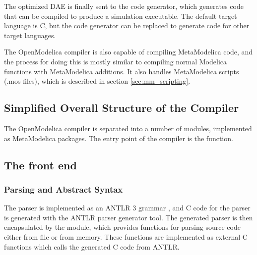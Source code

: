The optimized DAE is finally sent to the code generator, which generates code
that can be compiled to produce a simulation executable. The default target
language is C, but the code generator can be replaced to generate code for other
target languages.

The OpenModelica compiler is also capable of compiling MetaModelica code, and
the process for doing this is mostly similar to compiling normal Modelica
functions with MetaModelica additions. It also handles MetaModelica scripts
(.mos files), which is described in section \ref{sec:mm_scripting}.

\subsection{Simplified Overall Structure of the Compiler}
The OpenModelica compiler is separated into a number of modules, implemented as
MetaModelica packages. The entry point of the compiler is the
 function. 

\subsection{The front end}

\subsubsection{Parsing and Abstract Syntax}
The parser is implemented as an ANTLR 3 grammar \cite{antrl3}, and C code for
the parser is generated with the ANTLR parser generator tool.  The generated
parser is then encapsulated by the  module, which provides
functions for parsing source code either from file or from memory.  These
functions are implemented as external C functions which calls the generated C
code from ANTLR.

